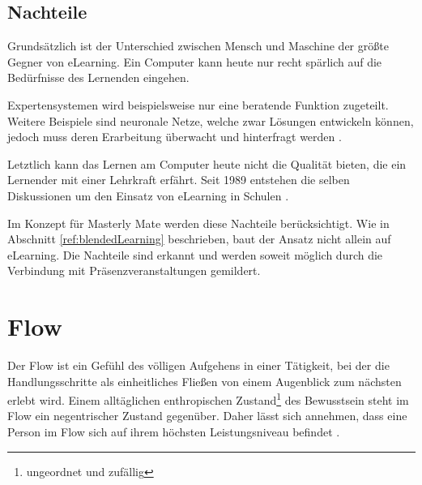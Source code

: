 \subsection{Nachteile}  
Grundsätzlich ist der Unterschied zwischen Mensch und Maschine der größte
Gegner von eLearning. Ein Computer kann heute nur recht spärlich auf die
Bedürfnisse des Lernenden eingehen. 

Expertensystemen wird beispielsweise nur eine beratende Funktion zugeteilt.
Weitere Beispiele sind neuronale Netze, welche zwar Lösungen entwickeln können,
jedoch muss deren Erarbeitung überwacht und hinterfragt werden
\cite{keller:2000}.

Letztlich kann das Lernen am Computer heute nicht die Qualität bieten, die ein
Lernender mit einer Lehrkraft erfährt. Seit 1989 entstehen die selben
Diskussionen um den Einsatz von eLearning in Schulen \cite{thome:1989}.

Im Konzept für Masterly Mate werden diese Nachteile berücksichtigt. Wie in
Abschnitt \ref{ref:blendedLearning} beschrieben, baut der Ansatz nicht allein
auf eLearning. Die Nachteile sind erkannt und werden soweit möglich durch die
Verbindung mit Präsenzveranstaltungen gemildert.

\section{Flow}\label{ref:basFlow}
Der Flow ist ein Gefühl des völligen Aufgehens in einer Tätigkeit, bei der
die Handlungsschritte als einheitliches Fließen von einem Augenblick zum
nächsten erlebt wird. Einem alltäglichen enthropischen
Zustand\footnote{ungeordnet und zufällig} des Bewusstsein steht im Flow ein
negentrischer Zustand gegenüber. Daher lässt sich annehmen, dass eine Person im
Flow sich auf ihrem höchsten Leistungsniveau befindet
\cite{csikszentmihalyi:1993}.
 
